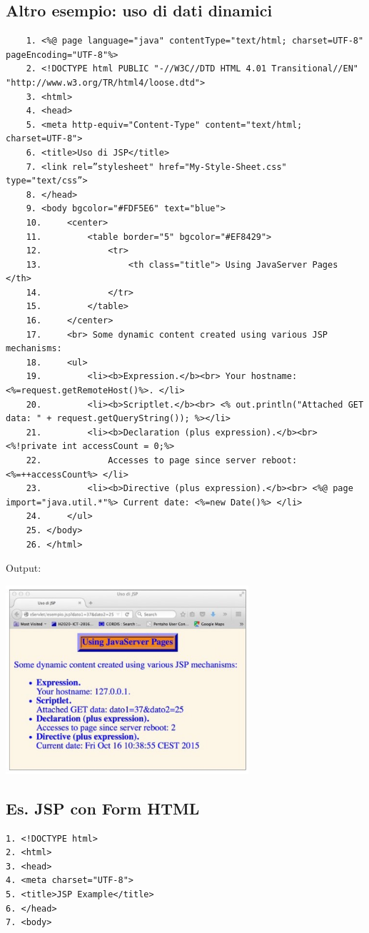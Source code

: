 \begin{itemize}
\subsection{Altro esempio: uso di dati dinamici}
\begin{verbatim}
    1. <%@ page language="java" contentType="text/html; charset=UTF-8" pageEncoding="UTF-8"%>
    2. <!DOCTYPE html PUBLIC "-//W3C//DTD HTML 4.01 Transitional//EN" "http://www.w3.org/TR/html4/loose.dtd">
    3. <html>
    4. <head>
    5. <meta http-equiv="Content-Type" content="text/html; charset=UTF-8">
    6. <title>Uso di JSP</title>
    7. <link rel=”stylesheet" href="My-Style-Sheet.css" type="text/css”>
    8. </head>
    9. <body bgcolor="#FDF5E6" text="blue">
    10.     <center>
    11.         <table border="5" bgcolor="#EF8429">
    12.             <tr>
    13.                 <th class="title"> Using JavaServer Pages </th>
    14.             </tr>
    15.         </table>
    16.     </center>
    17.     <br> Some dynamic content created using various JSP mechanisms:
    18.     <ul>
    19.         <li><b>Expression.</b><br> Your hostname: <%=request.getRemoteHost()%>. </li>
    20.         <li><b>Scriptlet.</b><br> <% out.println("Attached GET data: " + request.getQueryString()); %></li>
    21.         <li><b>Declaration (plus expression).</b><br> <%!private int accessCount = 0;%>
    22.             Accesses to page since server reboot: <%=++accessCount%> </li>
    23.         <li><b>Directive (plus expression).</b><br> <%@ page import="java.util.*"%> Current date: <%=new Date()%> </li>
    24.     </ul>
    25. </body>
    26. </html>
\end{verbatim}
Output:
\begin{center}
    \includegraphics[width=0.675\textwidth]{img/appWeb22.jpg}
\end{center}

\subsection{Es. JSP con Form HTML}
\begin{verbatim}
1. <!DOCTYPE html>
2. <html>
3. <head>
4. <meta charset="UTF-8">
5. <title>JSP Example</title>
6. </head>
7. <body>


\end{verbatim}
\end{itemize}
